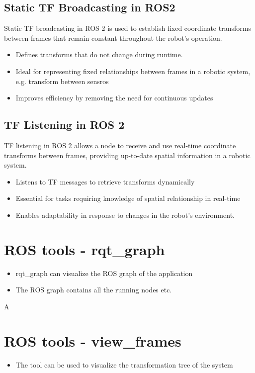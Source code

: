 \subsection{Static TF Broadcasting in ROS2}

Static TF broadcasting in ROS 2 is used to establish fixed coordinate transforms between frames that remain constant throughout the robot's operation.
\begin{itemize}
        \item Defines transforms that do not change during runtime.
        \item Ideal for representing fixed relationships between frames in a robotic system, e.g. transform between sensros
        \item Improves efficiency by removing the need for continuous updates

        
\end{itemize}

\subsection{TF Listening in ROS 2}
TF listening in ROS 2 allows a node to receive and use real-time coordinate transforms between frames, providing up-to-date spatial information in a robotic system.

\begin{itemize}
        \item Listens to TF messages to retrieve transforms dynamically
        \item Essential for tasks requiring knowledge of spatial relationship in real-time
        \item Enables adaptability in response to changes in the robot's environment.        
\end{itemize}


\section{ROS tools - rqt\_graph}
\begin{itemize}
        \item rqt\_graph can visualize the ROS graph of the application
        \item The ROS graph contains all the running nodes etc.
\end{itemize}

A
\section{ROS tools - view\_frames}
\begin{itemize}
        \item The tool can be used to visualize the transformation tree of the system
\end{itemize}


